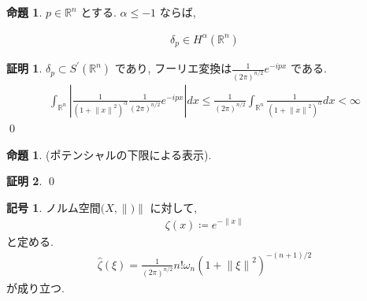 \documentclass[10pt, fleqn, label-section=none]{bxjsarticle}
\theoremstyle{definition}
\newtheorem{prop}[dfn]{命題}
\newtheorem{notation}[dfn]{記号}
\newtheorem*{pf*}{証明}
\newcommand{\abs}[1]{\left|#1\right|}
\newcommand{\norm}[1]{\left\|#1\right\|}
\renewcommand{\;}{\, ; \,}
\begin{document}
\begin{prop} $p \in \mathbb R^n$ とする. $\alpha \leq -1$ ならば, 

\begin{align*} \delta_p \in H^{\alpha}(\mathbb R^n) \end{align*}

\end{prop}
\begin{pf*}
$\delta_p \subset S^\prime (\mathbb R^n)$ であり, フーリエ変換は$\frac{1}{(2\pi)^{n/2}}e^{-i p x}$ である. 
\begin{align*} \int_{\mathbb R^n} \abs{ \frac{1}{(1 + \norm x ^2) ^\alpha}\frac{1}{(2\pi)^{n/2}} e^{-i p x}    } dx \leq \frac{1}{(2\pi)^{n/2}}  \int_{\mathbb R^n} \frac{1}{(1 + \norm x ^2) ^\alpha}  dx < \infty \end{align*}
\qed
\end{pf*}


\begin{prop}(ポテンシャルの下限による表示). 

\end{prop}
\begin{pf*}

\qed
\end{pf*}



\begin{notation}ノルム空間$(X, \norm )$ に対して, 
\begin{align*} \zeta(x) \coloneqq e^{-\norm{x}} \end{align*}
と定める. 
\begin{align*} \hat \zeta (\xi) = \frac{1}{(2\pi)^{n/2}} n! \omega_n (1 + \norm \xi ^2)^{-(n+1)/2} \end{align*}
が成り立つ. 
\end{notation}
\end{document}
